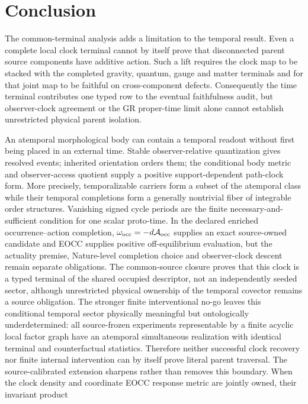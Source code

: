 \documentclass[11pt]{article}
\begin{document}
\section{Conclusion}

The common-terminal analysis adds a limitation to the temporal result. Even a
complete local clock terminal cannot by itself prove that disconnected parent
source components have additive action. Such a lift requires the clock map to
be stacked with the completed gravity, quantum, gauge and matter terminals
and for that joint map to be faithful on cross-component defects.
Consequently the time terminal contributes one typed row to the eventual
faithfulness audit, but observer-clock agreement or the GR proper-time limit
alone cannot establish unrestricted physical parent isolation.

An atemporal morphological body can contain a temporal readout without first
being placed in an external time. Stable observer-relative quantization gives
resolved events; inherited orientation orders them; the conditional body
metric and observer-access quotient supply a positive support-dependent
path-clock form. More precisely, temporalizable carriers form a subset of the
atemporal class while their temporal completions form a generally nontrivial
fiber of integrable order structures. Vanishing signed cycle periods are the
finite necessary-and-sufficient condition for one scalar proto-time. In the
declared enriched occurrence--action completion,
$\omega_{\rm occ}=-d\mathcal A_{\rm occ}$ supplies an exact source-owned
candidate and EOCC supplies positive off-equilibrium evaluation, but the
actuality premise, Nature-level completion choice and observer-clock descent
remain separate obligations. The common-source closure proves that this clock
is a typed terminal of the shared occupied descriptor, not an independently
seeded sector, although unrestricted physical ownership of the temporal
covector remains a source obligation.
The stronger finite interventional no-go leaves this conditional temporal
sector physically meaningful but ontologically underdetermined: all
source-frozen experiments representable by a finite acyclic local factor
graph have an atemporal simultaneous realization with identical terminal and
counterfactual statistics.  Therefore neither successful clock recovery nor
finite internal intervention can by itself prove literal parent traversal.
The source-calibrated extension sharpens rather than removes this boundary.
When the clock density and coordinate EOCC response metric are jointly owned,
their invariant product
\end{document}
